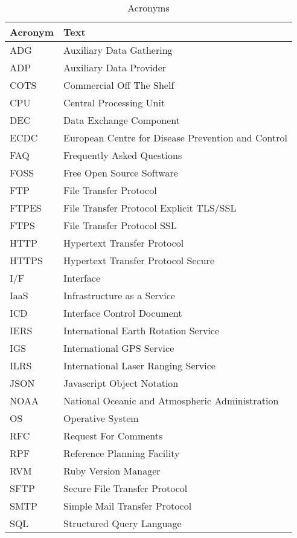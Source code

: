 \documentclass[dec_sum_main.tex]{subfiles}
\begin{document}
\begin{longtable}{|m{2.8cm}|m{10cm}|}
	\caption{Acronyms\label{long}} \\
    \hline
	\textbf{Acronym} & \textbf{Text} \\
	\hline
	ADG & Auxiliary Data Gathering \\ \hline
	ADP & Auxiliary Data Provider \\ \hline
	COTS & Commercial Off The Shelf \\ \hline
	CPU & Central Processing Unit \\ \hline
	DEC & Data Exchange Component \\ \hline
	ECDC & European Centre for Disease Prevention and Control \\ \hline
	FAQ & Frequently Asked Questions \\ \hline
	FOSS & Free Open Source Software \\ \hline
	FTP & File Transfer Protocol \\ \hline
	FTPES & File Transfer Protocol Explicit TLS/SSL \\ \hline
	FTPS & File Transfer Protocol SSL \\ \hline
	HTTP & Hypertext Transfer Protocol \\ \hline
	HTTPS & Hypertext Transfer Protocol Secure\\ \hline
	I/F & Interface \\ \hline
	IaaS & Infrastructure as a Service \\ \hline
	ICD & Interface Control Document \\ \hline
	IERS & International Earth Rotation Service \\ \hline
	IGS & International GPS Service \\ \hline
	ILRS & International Laser Ranging Service \\ \hline
	JSON & Javascript Object Notation \\ \hline
	NOAA & National Oceanic and Atmospheric Administration \\ \hline
	OS & Operative System \\ \hline
	RFC & Request For Comments \\ \hline
	RPF & Reference Planning Facility \\ \hline
	RVM & Ruby Version Manager \\ \hline
	SFTP & Secure File Transfer Protocol \\ \hline
	SMTP & Simple Mail Transfer Protocol \\ \hline
	SQL & Structured Query Language \\ \hline

\end{longtable}
\end{document}
